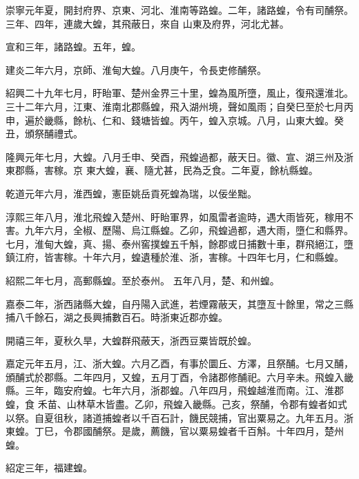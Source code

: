 \begin{pinyinscope}
 崇寧元年夏，開封府界、京東、河北、淮南等路蝗。二年，諸路蝗，令有司酺祭。三年、四年，連歲大蝗，其飛蔽日，來自
 山東及府界，河北尤甚。



 宣和三年，諸路蝗。五年，蝗。



 建炎二年六月，京師、淮甸大蝗。八月庚午，令長吏修酺祭。



 紹興二十九年七月，盱眙軍、楚州金界三十里，蝗為風所墮，風止，復飛還淮北。三十二年六月，江東、淮南北郡縣蝗，飛入湖州境，聲如風雨；自癸巳至於七月丙申，遍於畿縣，餘杭、仁和、錢塘皆蝗。丙午，蝗入京城。八月，山東大蝗。癸丑，頒祭酺禮式。



 隆興元年七月，大蝗。八月壬申、癸酉，飛蝗過都，蔽天日。徽、宣、湖三州及浙東郡縣，害稼。京
 東大蝗，襄、隨尤甚，民為乏食。二年夏，餘杭縣蝗。



 乾道元年六月，淮西蝗，憲臣姚岳貢死蝗為瑞，以佞坐黜。



 淳熙三年八月，淮北飛蝗入楚州、盱眙軍界，如風雷者逾時，遇大雨皆死，稼用不害。九年六月，全椒、歷陽、烏江縣蝗。乙卯，飛蝗過都，遇大雨，墮仁和縣界。七月，淮甸大蝗，真、揚、泰州窖撲蝗五千斛，餘郡或日捕數十車，群飛絕江，墮鎮江府，皆害稼。十年六月，蝗遺種於淮、浙，害稼。十四年七月，仁和縣蝗。



 紹熙二年七月，高郵縣蝗。至於泰州。
 五年八月，楚、和州蝗。



 嘉泰二年，浙西諸縣大蝗，自丹陽入武進，若煙霧蔽天，其墮亙十餘里，常之三縣捕八千餘石，湖之長興捕數百石。時浙東近郡亦蝗。



 開禧三年，夏秋久旱，大蝗群飛蔽天，浙西豆粟皆既於蝗。



 嘉定元年五月，江、浙大蝗。六月乙酉，有事於圜丘、方澤，且祭酺。七月又酺，頒酺式於郡縣。二年四月，又蝗，五月丁酉，令諸郡修酺祀。六月辛未。飛蝗入畿縣。三年，臨安府蝗。七年六月，浙郡蝗。八年四月，飛蝗越淮而南。江、淮郡蝗，食
 禾苗、山林草木皆盡。乙卯，飛蝗入畿縣。己亥，祭酺，令郡有蝗者如式以祭。自夏徂秋，諸道捕蝗者以千百石計，饑民競捕，官出粟易之。九年五月。浙東蝗。丁巳，令郡國酺祭。是歲，薦饑，官以粟易蝗者千百斛。十年四月，楚州蝗。



 紹定三年，福建蝗。




\end{pinyinscope}
